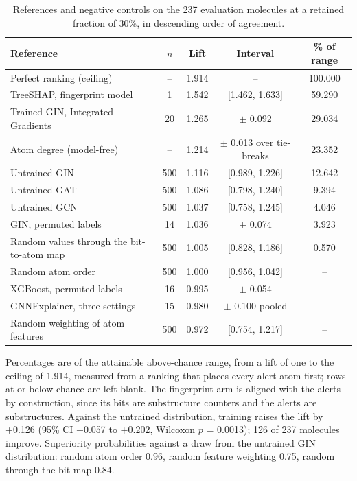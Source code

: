 \begin{table}[htbp]
\centering
\caption{References and negative controls on the 237 evaluation molecules at a retained fraction of 30\%, in descending order of agreement.}
\label{tab:controls}
\small
\setlength{\tabcolsep}{4pt}
\begin{tabular}{lcccc}
\toprule
Reference & $n$ & Lift & Interval & \% of range \\
\midrule
Perfect ranking (ceiling) & -- & 1.914 & -- & 100.000 \\
TreeSHAP, fingerprint model & 1 & 1.542 & [1.462, 1.633] & 59.290 \\
Trained GIN, Integrated Gradients & 20 & 1.265 & $\pm$ 0.092 & 29.034 \\
Atom degree (model-free) & -- & 1.214 & $\pm$ 0.013 over tie-breaks & 23.352 \\
Untrained GIN & 500 & 1.116 & [0.989, 1.226] & 12.642 \\
Untrained GAT & 500 & 1.086 & [0.798, 1.240] & 9.394 \\
Untrained GCN & 500 & 1.037 & [0.758, 1.245] & 4.046 \\
GIN, permuted labels & 14 & 1.036 & $\pm$ 0.074 & 3.923 \\
Random values through the bit-to-atom map & 500 & 1.005 & [0.828, 1.186] & 0.570 \\
Random atom order & 500 & 1.000 & [0.956, 1.042] & -- \\
XGBoost, permuted labels & 16 & 0.995 & $\pm$ 0.054 & -- \\
GNNExplainer, three settings & 15 & 0.980 & $\pm$ 0.100 pooled & -- \\
Random weighting of atom features & 500 & 0.972 & [0.754, 1.217] & -- \\
\bottomrule
\end{tabular}
\begin{flushleft}\footnotesize Percentages are of the attainable above-chance range, from a lift of one to the ceiling of 1.914, measured from a ranking that places every alert atom first; rows at or below chance are left blank. The fingerprint arm is aligned with the alerts by construction, since its bits are substructure counters and the alerts are substructures. Against the untrained distribution, training raises the lift by +0.126 (95\% CI +0.057 to +0.202, Wilcoxon $p$ = 0.0013); 126 of 237 molecules improve. Superiority probabilities against a draw from the untrained GIN distribution: random atom order 0.96, random feature weighting 0.75, random through the bit map 0.84.\end{flushleft}
\end{table}

